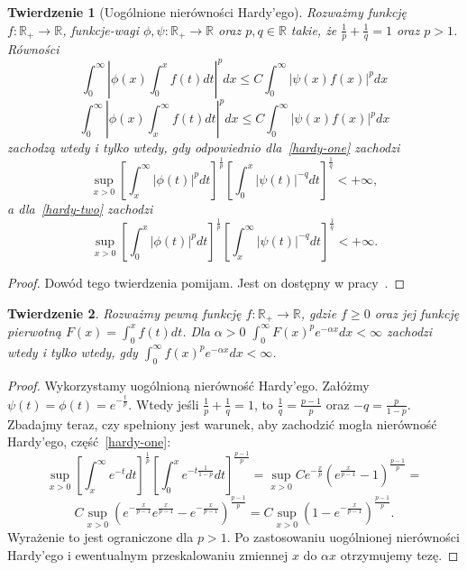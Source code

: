 \documentclass[licencjacka]{pracamgr}
\theoremstyle{definition}
\theoremstyle{definition}
\theoremstyle{plain}
\theoremstyle{plain}
\theoremstyle{plain}
\newtheorem{theorem}{Twierdzenie}[section]
\theoremstyle{plain}
\theoremstyle{plain}
\begin{document}
\begin{theorem}[Uogólnione nierówności Hardy'ego]\label{hardy}
    Rozważmy funkcję $f: \mathbb{R}_{+} \rightarrow \mathbb{R}$, funkcje-wagi
    $\phi, \psi: \mathbb{R}_{+} \rightarrow \mathbb{R}$ oraz $p, q \in
    \mathbb{R}$ takie, że $\frac{1}{p} + \frac{1}{q} = 1 $ oraz $p > 1$.  Równości 
\begin{equation}\label{hardy-one}
\int_0^\infty \left|
                \phi(x) \int_0^x f(t) dt
              \right|^p dx
\leq
C \int_0^\infty \left|
                    \psi(x)  f(x)
                \right|^p dx
\end{equation}
\begin{equation}\label{hardy-two}
\int_0^\infty \left|
                \phi(x) \int_x^\infty f(t) dt
              \right|^p dx
\leq
C \int_0^\infty \left|
                    \psi(x)  f(x)
                \right|^p dx
\end{equation}
zachodzą wtedy i tylko wtedy, gdy odpowiednio dla~\ref{hardy-one} zachodzi
\[
\sup_{x > 0}
\left[
\int_x^\infty  
   | \phi(t) |^p dt
\right]^{\frac{1}{p}}
\left[
\int_0^x
    | \psi(t) |^{-q} dt
\right]^{\frac{1}{q}} < + \infty,
\]
a dla~\ref{hardy-two} zachodzi
\[
\sup_{x > 0}
\left[
\int_0^x
   | \phi(t) |^p dt
\right]^{\frac{1}{p}}
\left[
\int_x^\infty
    | \psi(t) |^{-q} dt
\right]^{\frac{1}{q}} < + \infty.
\]

\end{theorem}
\begin{proof}
Dowód tego twierdzenia pomijam. Jest on dostępny w pracy~\cite{hardys}.
\end{proof}

\begin{theorem}\label{our-hardys-one}
Rozważmy pewną funkcję $f: \mathbb{R}_{+} \rightarrow \mathbb{R}$, gdzie $f
\geq 0$ oraz jej funkcję pierwotną $F(x) = \int_0^{x} f(t) dt$. Dla $\alpha > 0$ 
 $\int_0^\infty F(x)^pe^{- \alpha x}dx < \infty$
zachodzi wtedy i tylko wtedy, gdy
$\int_0^\infty f(x)^p e^{-\alpha x}dx < \infty$.
\end{theorem}
\begin{proof}
Wykorzystamy uogólnioną nierówność Hardy'ego.  Załóżmy $\psi(t) = \phi(t) =
e^{- \frac{t}{p} }$. Wtedy jeśli $\frac{1}{p} + \frac{1}{q} = 1 $, to
$\frac{1}{q} = \frac{p-1}{p}$ oraz $-q = \frac{p}{1-p}$.  Zbadajmy teraz, czy
spełniony jest warunek, aby zachodzić mogła nierówność Hardy'ego, część~\ref{hardy-one}:
$$
\sup_{x > 0}
\left[
\int_x^\infty  
    e^{-t} dt
\right]^{\frac{1}{p}}
\left[
\int_0^x
    e^{-t \frac{1}{1-p}} dt
\right]^{\frac{p-1}{p}}
=
\sup_{x > 0}
    C
    e^{- \frac{x}{p}}
    \left(
        e^{\frac{x}{p-1}} - 1
    \right)^{\frac{p-1}{p}}
=
$$
$$
C
\sup_{x > 0}
    \left(
    e^{- \frac{x}{p-1}}
        e^{\frac{x}{p-1}} -
    e^{- \frac{x}{p-1}}
    \right)^{\frac{p-1}{p}}
=
C
\sup_{x > 0}
    \left(
        1 -
    e^{- \frac{x}{p-1}}
    \right)^{\frac{p-1}{p}}. 
$$
Wyrażenie to jest ograniczone dla $p> 1$. Po zastosowaniu uogólnionej
nierówności Hardy'ego i ewentualnym przeskalowaniu zmiennej $x$ do $\alpha x$
otrzymujemy tezę.
\end{proof}
\end{document}

